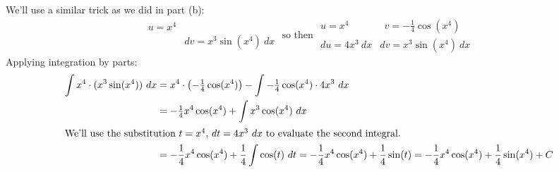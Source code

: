 \documentclass[10pt]{article}
\newenvironment{red}{\color{red}}{\ignorespacesafterend}
\begin{document}
\begin{enumerate}[leftmargin=0pt]
\begin{enumerate}
    \begin{red}
    We'll use a similar trick as we did in part (b):
    \[\begin{array}{ll}
        u = x^4 &  \\
         & dv = x^3\sin(x^4)\ dx
    \end{array}
    \textrm{ so then }
    \begin{array}{ll}
        u = x^4 & \ \ v = -\tfrac14 \cos(x^4) \\
        du = 4x^3\ dx &  dv = x^3\sin(x^4)\ dx
    \end{array}
    \]
    Applying integration by parts:
    \begin{align*}
        \int x^4\cdot (x^3\sin(x^4))\ dx &= x^4 \cdot \left(-\tfrac14 \cos(x^4)\right) - \int -\tfrac14\cos(x^4)\cdot 4x^3\ dx \\
        &= -\tfrac14 x^4\cos(x^4) + \int x^3\cos(x^4)\ dx\\
        \intertext{We'll use the substitution $t = x^4$, $dt = 4x^3\ dx$ to evaluate the second integral.}
        &= -\frac14 x^4\cos(x^4) + \frac14 \int \cos(t)\ dt
         = -\frac14 x^4\cos(x^4) + \frac14 \sin(t) 
         = -\frac14 x^4\cos(x^4) + \frac14 \sin(x^4) + C
    \end{align*}
    \end{red}
\end{enumerate}
\end{enumerate}
\end{document}
